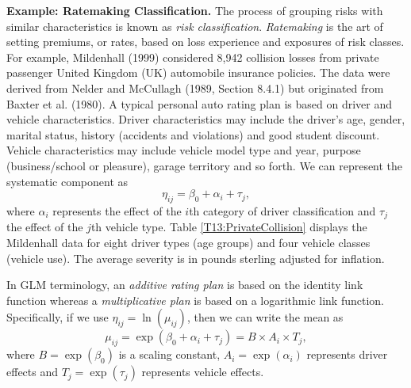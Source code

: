 \textbf{Example: Ratemaking Classification.} The process of grouping
risks with similar characteristics is known as \emph{risk
classification}. \emph{Ratemaking} is the art of setting premiums,
or rates, based on loss experience and exposures of risk classes.
For example, Mildenhall (1999) considered 8,942 collision losses
from private passenger United Kingdom (UK) automobile insurance
policies. The data were derived from Nelder and McCullagh (1989,
Section 8.4.1) but originated from Baxter et al. (1980). A typical
personal auto rating plan is based on driver and vehicle
characteristics. Driver characteristics may include the driver's
age, gender, marital status, history (accidents and violations) and
good student discount. Vehicle characteristics may include vehicle
model type and year, purpose (business/school or pleasure), garage
territory and so forth. We can represent the systematic component as
\begin{equation*}
\eta_{ij} = \beta_0 + \alpha_i + \tau_j,
\end{equation*}
where $\alpha_i$ represents the effect of the $i$th category of
driver classification and $\tau_j$ the effect of the $j$th vehicle
type. Table \ref{T13:PrivateCollision} displays the Mildenhall data
for eight driver types (age groups) and four vehicle classes
(vehicle use). The average severity is in pounds sterling adjusted
for inflation.

 

In GLM terminology, an \emph{additive rating plan} is based on the
identity link function whereas a \emph{multiplicative plan} is based
on a logarithmic link function. Specifically, if we use $ \eta_{ij}
= \ln ( \mu _{ij}) $, then we can write the mean as
\begin{equation}\label{E13:MultiplicativePrems}
\mu _{ij} = \exp(\beta_0 + \alpha_i + \tau_j) = B \times A_i \times
T_j,
\end{equation}
where $B=\exp(\beta_0)$ is a scaling constant, $A_i=\exp(\alpha_i)$
represents driver effects and  $T_j=\exp(\tau_j)$ represents vehicle
effects.



